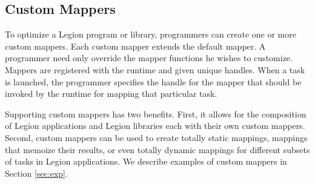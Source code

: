 \subsection{Custom Mappers}
\label{sec:custommap}
To optimize a Legion program or library, programmers can create one or more custom mappers.  
Each custom mapper extends the default mapper.  A programmer need only override the mapper functions 
he wishes to customize.  Mappers are registered with the runtime and given unique handles.
When a task is launched, the programmer specifies the handle for the mapper that should be invoked by the runtime for
mapping that particular task.

Supporting custom mappers has two benefits.  First, it allows for the composition of Legion applications
and Legion libraries each with their own custom mappers.
Second, custom mappers can be used to create totally static mappings, 
mappings that memoize their results, or even totally dynamic mappings for different 
subsets of tasks in Legion applications.  We describe examples of 
custom mappers in Section \ref{sec:exp}.






